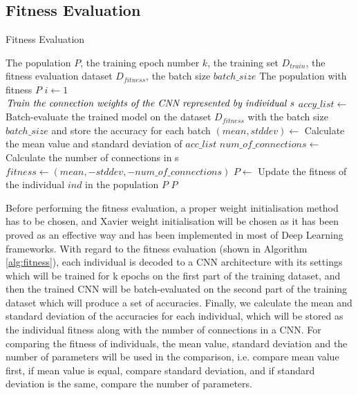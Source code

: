 \documentclass[conference]{IEEEtran}
\begin{document}
\subsection{Fitness Evaluation}
\begin{algorithm}
	\caption{Fitness Evaluation}
	\label{alg:fitness}
	\begin{algorithmic}
		\renewcommand{\algorithmicrequire}{\textbf{Input:}}
		\renewcommand{\algorithmicensure}{\textbf{Output:}}
		\REQUIRE The population $P$, the training epoch number $k$, the training set $D_{train}$, the fitness evaluation dataset $D_{fitness}$, the batch size $batch\_size$
		\ENSURE The population with fitness $P$
			\STATE $i \leftarrow 1$
				\STATE $\textit{Train the connection weights of the CNN } \newline \textit{represented by individual s}$
			\ENDWHILE
			\STATE $accy\_list \leftarrow$ Batch-evaluate the trained model on the dataset $D_{fitness}$ with the batch size $batch\_size$ and store the accuracy for each batch
			\STATE $(mean, stddev) \leftarrow$ Calculate the mean value and standard deviation of  $acc\_list$
			\STATE $num\_of\_connections \leftarrow$ Calculate the number of connections in s
			\STATE $fitness \leftarrow (mean, -stddev, -num\_of\_connections)$
			\STATE $P \leftarrow$ Update the fitness of the individual $ind$ in the population $P$
		\ENDFOR	
		\RETURN $P$	
	\end{algorithmic}
\end{algorithm}

Before performing the fitness evaluation, a proper weight initialisation method has to be chosen, and Xavier weight initialisation \cite{WeightIniti:Glorot} will be chosen as it has been proved as an effective way and has been implemented in most of Deep Learning frameworks. With regard to the fitness evaluation (shown in Algorithm \ref{alg:fitness}), each individual is decoded to a CNN architecture with its settings which will be trained for k epochs on the first part of the training dataset, and then the trained CNN will be batch-evaluated on the second part of the training dataset which will produce a set of accuracies. Finally, we calculate the mean and standard deviation of the accuracies for each individual, which will be stored as the individual fitness along with the number of connections in a CNN. 
For comparing the fitness of individuals, the mean value, standard deviation and the number of parameters will be used in the comparison, i.e. compare mean value first, if mean value is equal, compare standard deviation, and if standard deviation is the same, compare the number of parameters.
\end{document}
